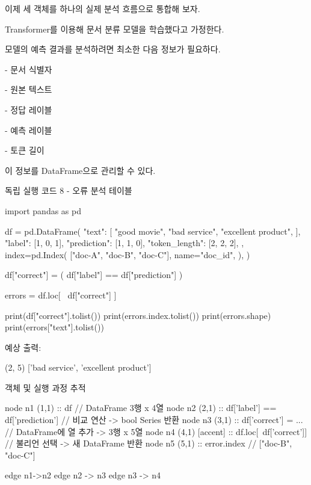 이제 세 객체를 하나의 실제 분석 흐름으로 통합해 보자.

Transformer를 이용해 문서 분류 모델을 학습했다고 가정한다.

모델의 예측 결과를 분석하려면 최소한 다음 정보가 필요하다.

\begin{dhksmry}
    - 문서 식별자

    - 원본 텍스트

    - 정답 레이블

    - 예측 레이블

    - 토큰 길이
\end{dhksmry}

이 정보를 DataFrame으로 관리할 수 있다.

\begin{dhknote}
\begin{dhksmry}[centered]
독립 실행 코드 8 - 오류 분석 테이블
\end{dhksmry}
\end{dhknote}

\begin{dhkcode}
import pandas as pd

df = pd.DataFrame(
    {
        "text": [
            "good movie",
            "bad service",
            "excellent product",
        ],
        "label": [1, 0, 1],
        "prediction": [1, 1, 0],
        "token_length": [2, 2, 2],
    },
    index=pd.Index(
        ["doc-A", "doc-B", "doc-C"],
        name="doc_id",
    ),
)

df["correct"] = (
    df["label"] == df["prediction"]
)

errors = df.loc[
    ~df["correct"]
]

print(df["correct"].tolist())
print(errors.index.tolist())
print(errors.shape)
print(errors["text"].tolist())
\end{dhkcode}

예상 출력:

\begin{dhkzsh}
(2, 5)
['bad service', 'excellent product']
\end{dhkzsh}

객체 및 실행 과정 추적

\begin{dhkgraph}[uniform]
node n1 (1,1) :: df // DataFrame 3행 x 4열
node n2 (2,1) :: df['label'] == df['prediction'] // 비교 연산 -> bool Series 반환
node n3 (3,1) :: df['correct'] = ... // DataFrame에 열 추가 -> 3행 x 5열
node n4 (4,1) [accent] :: df.loc[~df['correct']] // 불리언 선택 -> 새 DataFrame 반환
node n5 (5,1) :: error.index // ["doc-B", "doc-C"]

edge n1->n2
edge n2 -> n3
edge n3 -> n4
\end{dhkgraph}

